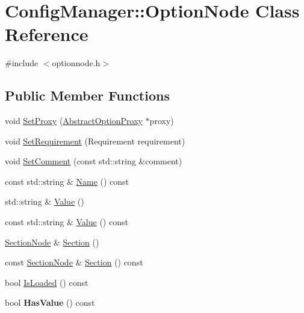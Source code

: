 \hypertarget{class_config_manager_1_1_option_node}{}\section{Config\+Manager\+:\+:Option\+Node Class Reference}
\label{class_config_manager_1_1_option_node}


{\ttfamily \#include $<$optionnode.\+h$>$}

\subsection*{Public Member Functions}
\begin{DoxyCompactItemize}
\item 
void \hyperlink{class_config_manager_1_1_option_node_a6b11e372911679bd045e3ee1f43cf4ba}{Set\+Proxy} (\hyperlink{class_config_manager_1_1_abstract_option_proxy}{Abstract\+Option\+Proxy} $\ast$proxy)
\item 
void \hyperlink{class_config_manager_1_1_option_node_adfb4172e5929b7927243b60ba8d28485}{Set\+Requirement} (Requirement requirement)
\item 
void \hyperlink{class_config_manager_1_1_option_node_a58f8440e7549ce5785db09886e79e2a5}{Set\+Comment} (const std\+::string \&comment)
\item 
const std\+::string \& \hyperlink{class_config_manager_1_1_option_node_af9e6b47860fc8718236e3fe29f043cd0}{Name} () const 
\item 
std\+::string \& \hyperlink{class_config_manager_1_1_option_node_aa33beb6d850388f3f6a41386d32164f1}{Value} ()
\item 
const std\+::string \& \hyperlink{class_config_manager_1_1_option_node_a3cbcb849cc14c06121f658b4aab2f8de}{Value} () const 
\item 
\hyperlink{class_config_manager_1_1_section_node}{Section\+Node} \& \hyperlink{class_config_manager_1_1_option_node_a56ec62f82a04eeb275f711a38766a4b2}{Section} ()
\item 
const \hyperlink{class_config_manager_1_1_section_node}{Section\+Node} \& \hyperlink{class_config_manager_1_1_option_node_a5f04016950d1b512d1b3efad7558da13}{Section} () const 
\item 
bool \hyperlink{class_config_manager_1_1_option_node_a5c0a779da4931dab931cef2d9f9b1d70}{Is\+Loaded} () const 
\item 
bool {\bfseries Has\+Value} () const \hypertarget{class_config_manager_1_1_option_node_acc9389da929330b79e78a8dcb6c66f11}{}\label{class_config_manager_1_1_option_node_acc9389da929330b79e78a8dcb6c66f11}

\end{DoxyCompactItemize}


